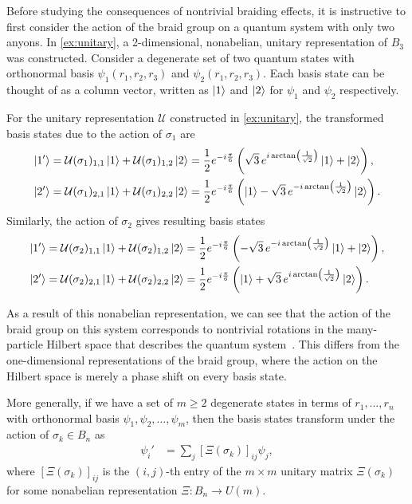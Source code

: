 Before studying the consequences of nontrivial braiding effects, it is instructive to first consider the action of the braid group on a quantum system with only two anyons. In \cref{ex:unitary}, a 2-dimensional, nonabelian, unitary representation of $B_3$ was constructed. Consider a degenerate set of two quantum states with orthonormal basis $\psi_1(r_1,r_2,r_3)$ and $\psi_2(r_1,r_2,r_3)$. Each basis state can be thought of as a column vector, written as $\ket{1}$ and $\ket{2}$ for $\psi_1$ and $\psi_2$ respectively.

For the unitary representation $\mathcal{U}$ constructed in \cref{ex:unitary}, the transformed basis states due to the action of $\sigma_1$ are
\begin{align}
    \ket{1'} &= \mathcal{U}(\sigma_1)_{1,1}\ket{1} + \mathcal{U}(\sigma_1)_{1,2}\ket{2} = \frac{1}{2}e^{-i\frac{\pi}{6}}\left( \sqrt{3}\,e^{i\arctan\left( \frac{1}{\sqrt{2}} \right)}\ket{1} + \ket{2} \right), \\
    \ket{2'} &= \mathcal{U}(\sigma_1)_{2,1}\ket{1} + \mathcal{U}(\sigma_1)_{2,2}\ket{2} = \frac{1}{2}e^{-i\frac{\pi}{6}}\left( \ket{1} - \sqrt{3}\,e^{-i\arctan\left( \frac{1}{\sqrt{2}} \right)}\ket{2} \right).
\end{align}
Similarly, the action of $\sigma_2$ gives resulting basis states
\begin{align}
    \ket{1'} &= \mathcal{U}(\sigma_2)_{1,1}\ket{1} + \mathcal{U}(\sigma_2)_{1,2}\ket{2} = \frac{1}{2}e^{-i\frac{\pi}{6}}\left( -\sqrt{3}\,e^{-i\arctan\left( \frac{1}{\sqrt{2}} \right)}\ket{1} + \ket{2} \right), \\
    \ket{2'} &= \mathcal{U}(\sigma_2)_{2,1}\ket{1} + \mathcal{U}(\sigma_2)_{2,2}\ket{2} = \frac{1}{2}e^{-i\frac{\pi}{6}}\left( \ket{1} + \sqrt{3}\,e^{i\arctan\left( \frac{1}{\sqrt{2}} \right)}\ket{2} \right).
\end{align}

As a result of this nonabelian representation, we can see that the action of the braid group on this system corresponds to nontrivial rotations in the many-particle Hilbert space that describes the quantum system~\cite{Nayak2008,Deshmukh}. This differs from the one-dimensional representations of the braid group, where the action on the Hilbert space is merely a phase shift on every basis state.

More generally, if we have a set of $m\geq 2$ degenerate states in terms of $r_1,\dots,r_n$ with orthonormal basis $\psi_1,\psi_2,\dots,\psi_m$, then the basis states transform under the action of $\sigma_k\in B_n$ as
\begin{align}
    \psi_i' &= \sum_{j}{\left[ \Xi(\sigma_k) \right]}_{ij}\psi_j,
\end{align}
where ${\left[ \Xi(\sigma_k) \right]}_{ij}$ is the $(i,j)$-th entry of the $m\times m$ unitary matrix $\Xi(\sigma_k)$ for some nonabelian representation $\Xi:B_n\to U(m)$.

